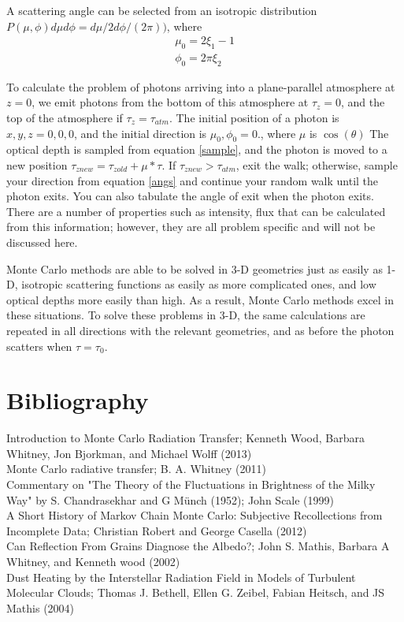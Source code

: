 \documentclass[a4paper]{article}
\begin{document}
A scattering angle can be selected from an isotropic distribution $P(\mu,\phi)d\mu d\phi = d\mu / 2d\phi/(2\pi))$, where
\begin{equation}
\begin{aligned}
\mu_0 = 2\xi_1 -1 \\
\phi_0 = 2\pi \xi_2
\label{angs}
\end{aligned}
\end{equation}

To calculate the problem of photons arriving into a plane-parallel atmosphere at $z=0$, we emit photons from the bottom of this atmosphere at $\tau_z=0$, and the top of the atmosphere if $\tau_z = \tau_{atm}$. The initial position of a photon is $x,y,z = 0,0,0$, and the initial direction is $\mu_0, \phi_0 = 0$., where $\mu$ is $\cos(\theta)$ The optical depth is sampled from equation \ref{sample}, and the photon is moved to a new position $\tau_{znew} = \tau_{zold} + \mu*\tau$. If $\tau_{znew} > \tau_{atm}$, exit the walk; otherwise, sample your direction from equation \ref{angs} and continue your random walk until the photon exits. You can also tabulate the angle of exit when the photon exits. There are a number of properties such as intensity, flux that can be calculated from this information; however, they are all problem specific and will not be discussed here.

Monte Carlo methods are able to be solved in 3-D geometries just as easily as 1-D, isotropic scattering functions as easily as more complicated ones, and low optical depths more easily than high. As a result, Monte Carlo methods excel in these situations. To solve these problems in 3-D, the same calculations are repeated in all directions with the relevant geometries, and as before the photon scatters when $\tau = \tau_0$.









\section{Bibliography}
Introduction to Monte Carlo Radiation Transfer; Kenneth Wood, Barbara Whitney, Jon Bjorkman, and Michael Wolff (2013) \\
Monte Carlo radiative transfer; B. A. Whitney (2011) \\
Commentary on "The Theory of the Fluctuations in Brightness of the Milky Way" by S. Chandrasekhar and G M\"unch (1952); John Scale (1999) \\
A Short History of Markov Chain Monte Carlo: Subjective Recollections from Incomplete Data; Christian Robert and George Casella (2012) \\
Can Reflection From Grains Diagnose the Albedo?; John S. Mathis, Barbara A Whitney, and Kenneth wood (2002) \\
Dust Heating by the Interstellar Radiation Field in Models of Turbulent Molecular Clouds; Thomas J. Bethell, Ellen G. Zeibel, Fabian Heitsch, and JS Mathis (2004)
\end{document}
